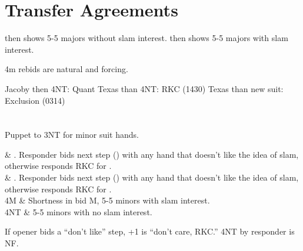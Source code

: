 \documentclass[tom-ari]{subfile}
\begin{document}
\section{Transfer Agreements}

 then  shows 5-5 majors without slam interest.
 then  shows 5-5 majors with slam interest.

4m rebids are natural and forcing.

Jacoby then 4NT:  Quant
Texas than 4NT:  RKC (1430)
Texas than new suit: Exclusion (0314)

\section[3S]{}

Puppet to 3NT for minor suit hands.

\begin{bidtable}{}
	 & \ddd. Responder bids next step () with any hand that doesn't like the idea of slam, otherwise responds RKC for \ddd. \\
	 & \ccc. Responder bids next step () with any hand that doesn't like the idea of slam, otherwise responds RKC for \ccc. \\
	4M & Shortness in bid M, 5-5 minors with slam interest. \\
	4NT & 5-5 minors with no slam interest. \\
\end{bidtable}

If opener bids a ``don't like'' step, +1 is ``don't care, RKC.'' 4NT by responder is NF.
\end{document}
